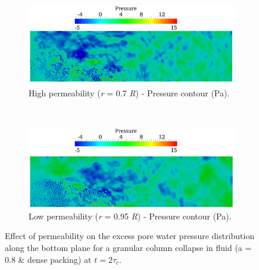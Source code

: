 \documentclass[12pt,a4paper,twocolumn,fleqn]{narms}
\begin{document}
\begin{figure}
\ContinuedFloat
\begin{subfigure}[t]{0.975\linewidth}
	\centering
    \includegraphics[width=\linewidth]{figs/a08/r07_PWP_flow_press_dense}
    \caption{High permeability (\textit{r} = 0.7 \textit{R}) - Pressure contour 
    (Pa).}
    \label{fig:r07_PWPress_flow_dense}
\end{subfigure}
\\
\begin{subfigure}[t]{0.975\linewidth}
	\centering
    \includegraphics[width=\linewidth]{figs/a08/r095_PWP_flow_press_dense}
    \caption{Low permeability (\textit{r} = 0.95 \textit{R}) - Pressure contour 
    (Pa).}
    \label{fig:r095_PWPress_flow_dense}
\end{subfigure}
\caption{Effect of permeability on the excess pore water pressure distribution 
along the bottom plane for a granular column collapse in fluid (a = 0.8 \& 
dense packing) at $t = 2\tau_c$.}
\label{fig:PWP_flow_dense}
\end{figure}
\end{document}
